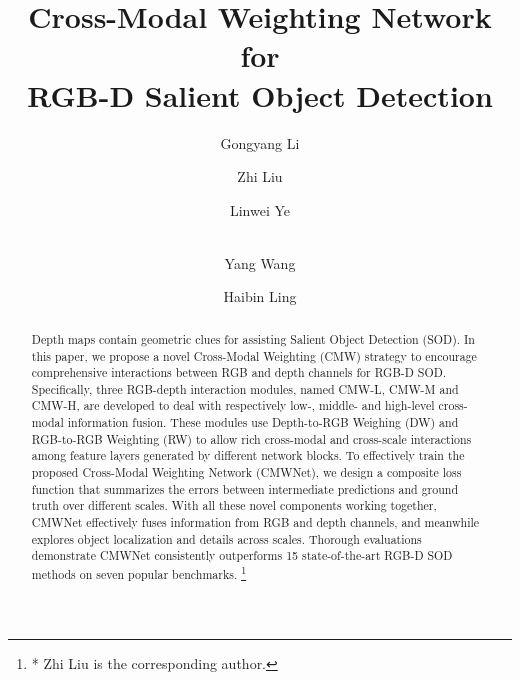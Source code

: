 \documentclass[runningheads]{llncs}
\newcommand\blfootnote[1]{\begingroup
\renewcommand\thefootnote{}\footnote{#1}\addtocounter{footnote}{-1}\endgroup
}
\begin{document}
\mainmatter




\title{Cross-Modal Weighting Network for \\ RGB-D Salient Object Detection}  
\author{Gongyang Li \and
Zhi Liu \and
Linwei Ye \and \\
Yang Wang \and
Haibin Ling}


\maketitle              \begin{abstract}
Depth maps contain geometric clues for assisting Salient Object Detection (SOD).
In this paper, we propose a novel Cross-Modal Weighting (CMW) strategy to encourage comprehensive interactions between RGB and depth channels for RGB-D SOD.
Specifically, three RGB-depth interaction modules, named CMW-L, CMW-M and CMW-H, are developed to deal with respectively low-, middle- and high-level cross-modal information fusion.
These modules use Depth-to-RGB Weighing (DW) and RGB-to-RGB Weighting (RW) to allow rich cross-modal and cross-scale interactions among feature layers generated by different network blocks.
To effectively train the proposed Cross-Modal Weighting Network (CMWNet), we design a composite loss function that summarizes the errors between intermediate predictions and ground truth over different scales.
With all these novel components working together, CMWNet effectively fuses information from RGB and depth channels, and meanwhile explores object localization and details across scales.
Thorough evaluations demonstrate CMWNet consistently outperforms 15 state-of-the-art RGB-D SOD methods on seven popular benchmarks.
\blfootnote{* Zhi Liu is the corresponding author.}

\end{abstract}
\end{document}
